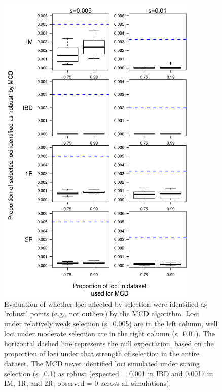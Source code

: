 \documentclass[12pt, oneside]{amsart}
\begin{document}
\newpage
\begin{figure}[h]
\begin{center}
\includegraphics[height=6in]{../figures_man2/S3-LandsharcProportionSelectedMCD.pdf}
\end{center}
\caption[]{Evaluation of whether loci affected by selection were identified as 'robust' points (e.g., not outliers) by the MCD algorithm. Loci under relatively weak selection (s=0.005) are in the left column, well loci under moderate selection are in the right column (s=0.01). The horizontal dashed line represents the null expectation, based on the proportion of loci under that strength of selection in the entire dataset. The MCD never identified loci simulated under strong selection (s=0.1) as robust (expected = 0.001 in IBD and 0.0017 in IM, 1R, and 2R; observed = 0 across all simulations).} 
 \label{fig:???}
\end{figure}
\end{document}
